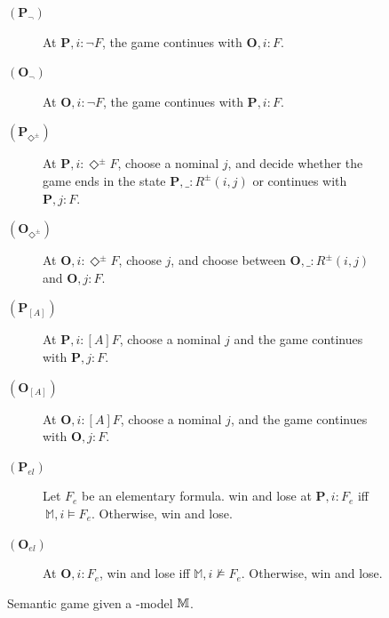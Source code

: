 \begin{figure}
{\begin{minipage}[t]{\textwidth}
\begin{description}
\item[$(\mathbf{P}_\neg)$] At $\mathbf{P},  i : \neg  F $, the game continues with $\mathbf{O},  i :  F $.\\
\item[$(\mathbf{O}_\neg)$] \vspace{-2mm}At $\mathbf{O},  i : \neg  F $, the game continues with $\mathbf{P}, i :  F $.\\
    \item[$(\mathbf{P}_{\Diamond^\pm})$] At $\mathbf{P}, i: \Diamond^\pm  F $, \Ic choose a nominal $j$, and \You decide whether the game ends in the state $\mathbf{P},\_:R^\pm(i,j)$ or continues with $\mathbf{P},j:  F $.\\
        \item[$(\mathbf{O}_{\Diamond^\pm})$] \vspace{-2mm} At $\mathbf{O},i: \Diamond^\pm  F $, \You choose  $j$, and \Ic choose between $\mathbf{O},\_:R^\pm(i,j)$ and $\mathbf{O},j: F $.\\
\item[$(\mathbf{P}_{[A]})$] At $\mathbf{P},i: [A] F $, \You choose a nominal $j$ and the game continues with $\mathbf{P},j: F $.\\
\item[$(\mathbf{O}_{[A]})$] \vspace{-2mm} At $\mathbf{O},i: [A] F $, \Ic choose a nominal $j$, and the game continues with $\mathbf{O},j:  F $.\\
\item[$(\mathbf{P}_{el})$] Let $ F _{e}$ be an elementary formula. \Ic win and \You lose at $\mathbf{P}, i : F _{e}$ iff $~\mathbb{M}, i  \models  F _{e}$. Otherwise, \You win and \Ic lose.\\
\item[$(\mathbf{O}_{el})$] \vspace{-2mm}At $\mathbf{O}, i  :  F _{e}$, \Ic win and \You lose iff $\mathbb{M}, i \not \models  F _{e}$. Otherwise, \You win and \Ic lose.\\
\end{description}
    \hrulefill
\end{minipage}
}
\caption{Semantic game given a \PNL-model $\mathbb{M}$.\label{fig:game-rules}}
\end{figure}


